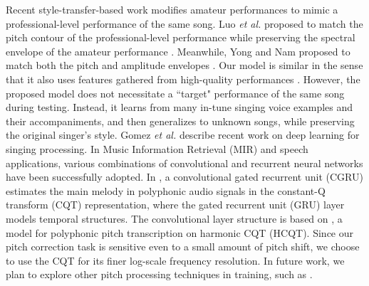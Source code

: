Recent style-transfer-based work modifies amateur performances to mimic a professional-level performance of the same song. Luo \textit{et al.} proposed to match the pitch contour of the professional-level performance while preserving the spectral envelope of the amateur performance \cite{luo2018singing}. Meanwhile, Yong and Nam proposed to match both the pitch and amplitude envelopes \cite{yong2018singing}. Our model is similar in the sense that it also uses features gathered from high-quality performances \cite{wager2018intonation}. However, the proposed model does not necessitate a ``target" performance of the same song during testing. Instead, it learns from many in-tune singing voice examples and their accompaniments, and then generalizes to unknown songs, while preserving the original singer's style.
Gomez {\it et al.} \cite{gomez2018deep} describe recent work on deep learning for singing processing. In Music Information Retrieval (MIR) and speech applications, various combinations of convolutional and recurrent neural networks have been successfully adopted. In \cite{basaranmain}, a convolutional gated recurrent unit (CGRU) estimates the main melody in polyphonic audio signals in the constant-Q transform (CQT) representation, where the gated recurrent unit (GRU) layer \cite{chung2014empirical, ChoK2014arxiv} models temporal structures. The convolutional layer structure is based on \cite{bittner2017deep}, a model for polyphonic pitch transcription on harmonic CQT (HCQT). Since our pitch correction task is sensitive even to a small amount of pitch shift, we choose to use the CQT for its finer log-scale frequency resolution. 
In future work, we plan to explore other pitch processing techniques in training, such as \cite{waloschek2018driftin}.

